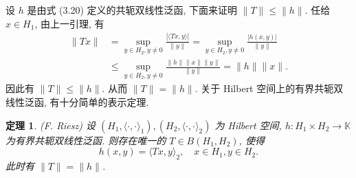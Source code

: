 \documentclass[openany]{ctexbook}
\theoremstyle{kaiti}
\newtheorem{theorem}{定理}[section]
\theoremstyle{normal}
\begin{document}
设 $h$ 是由式 (3.20) 定义的共轭双线性泛函, 下面来证明 $\|T\| \leqslant\|h\|$. 任给 $x \in H_1$, 由上一引理, 有
$$
\begin{aligned}
\|T x\| &=\sup_{y \in H_2, y \neq 0} \frac{|\langle T x, y\rangle|}{\|y\|}=\sup_{y \in H_2, y \neq 0} \frac{|h(x, y)|}{\|y\|} \\
& \leqslant \sup_{y \in H_2, y \neq 0} \frac{\|h\|\|x\|\|y\|}{\|y\|}=\|h\|\|x\|.
\end{aligned}
$$
因此有 $\|T\| \leqslant\|h\|$. 从而 $\|T\|=\|h\|$. 关于 Hilbert 空间上的有界共轭双线性泛函, 有十分简单的表示定理.

\begin{theorem}
(F. Riesz) 设 $\left(H_1,\langle\cdot, \cdot\rangle_1\right),\left(H_2,\langle\cdot, \cdot\rangle_2\right)$ 为 Hilbert 空间, $h: H_1 \times H_2 \rightarrow \mathbb{K}$ 为有界共轭双线性泛函. 则存在唯一的 $T \in B\left(H_1, H_2\right)$, 使得
$$
h(x, y)=\langle T x, y\rangle_2, \quad x \in H_1, y \in H_2.
$$
此时有 $\|T\|=\|h\|$.
\end{theorem}
\end{document}
